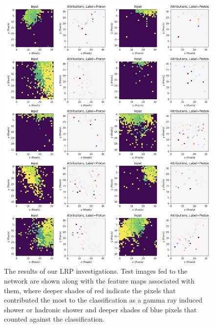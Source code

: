 \begin{figure}[ht] 
        \centering \includegraphics[width=1.0\columnwidth]{figures/newexpchec2.png}

        \caption{
                \label{fig:lrp} %
                The results of our LRP investigations. Test images fed to the network are shown along with the feature maps associated with them, where deeper shades of red indicate the pixels that contributed the most to the classification as a gamma ray induced shower or hadronic shower and deeper shades of blue pixels that counted against the classification.  
        }
\end{figure}
